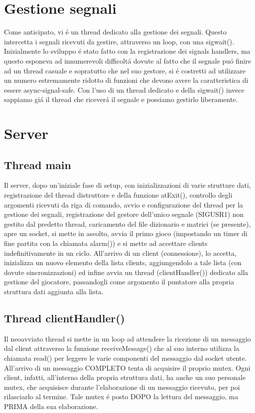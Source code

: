 \section{Gestione segnali}

Come anticipato, vi \'e un thread dedicato alla gestione dei segnali. Questo intercetta i segnali ricevuti da gestire, attraverso un loop, con una sigwait(). Inizialmente lo sviluppo \'e stato fatto con la registrazione dei signals handlers, ma questo esponeva ad innumerevoli difficolt\'a dovute al fatto che il segnale pu\'o finire ad un thread casuale e sopratutto che nel suo gestore, si \'e costretti ad utilizzare un numero estremamente ridotto di funzioni che devono avere la caratteristica di essere async-signal-safe. Con l'uso di un thread dedicato e della sigwait() invece sappiamo gi\'a il thread che ricever\'a il segnale e possiamo gestirlo liberamente.

\section{Server}

\subsection{Thread main}

Il server, dopo un'iniziale fase di setup, con inizializzazioni di varie strutture dati, registrazione del thread distruttore e della funzione atExit(), controllo degli argomenti ricevuti da riga di comando, avvio e configurazione del thread per la gestione dei segnali, registrazione del gestore dell'unico segnale (SIGUSR1) non gestito dal predetto thread, caricamento del file dizionario e matrici (se presente), apre un socket, si mette in ascolto, avvia il primo gioco (impostando un timer di fine partita con la chiamata alarm()) e si mette ad accettare clients indefinitivamente in un ciclo. All'arrivo di un client (connessione), lo accetta, inizializza un nuovo elemento della lista clients, aggiungendolo a tale lista (con dovute sincronizzazioni) ed infine avvia un thread (clientHandler()) dedicato alla gestione del giocatore, passandogli come argomento il puntatore alla propria struttura dati aggiunta alla lista.

 \subsection{Thread clientHandler()}

 Il neoavviato thread si mette in un loop ad attendere la ricezione di un messaggio dal client attraverso la funzione receiveMessage() che al suo interno utilizza la chiamata read() per leggere le varie componenti del messaggio dal socket utente. All'arrivo di un messaggio COMPLETO tenta di acquisire il proprio mutex. Ogni client, infatti, all'interno della propria struttura dati, ha anche un suo personale mutex, che acquisisce durante l'elaborazione di un messaggio ricevuto, per poi rilasciarlo al termine. Tale mutex \'e posto DOPO la lettura del messaggio, ma PRIMA della sua elaborazione.
 
